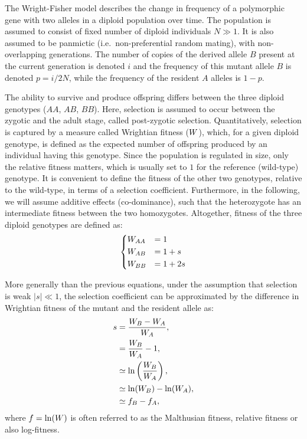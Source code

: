 The Wright-Fisher model describes the change in frequency of a polymorphic gene with two alleles in a diploid population over time.
The population is assumed to consist of fixed number of diploid individuals $N \gg 1$.
It is also assumed to be panmictic (i.e.~non-preferential random mating), with non-overlapping generations.
The number of copies of the derived allele $B$ present at the current generation is denoted $i$ and the frequency of this mutant allele $B$ is denoted $p = i/2N$, while the frequency of the resident $A$ alleles is $1 - p$.

The ability to survive and produce offspring differs between the three diploid genotypes ($AA$, $AB$, $BB$).
Here, selection is assumed to occur between the zygotic and the adult stage, called post-zygotic selection.
Quantitatively, selection is captured by a measure called Wrightian fitness ($W$), which, for a given diploid genotype, is defined as the expected number of offspring produced by an individual having this genotype.
Since the population is regulated in size, only the relative fitness matters, which is usually set to $1$ for the reference (wild-type) genotype.
It is convenient to define the fitness of the other two genotypes, relative to the wild-type, in terms of a selection coefficient.
Furthermore, in the following, we will assume additive effects (co-dominance), such that the heterozygote has an intermediate fitness between the two homozygotes.
Altogether, fitness of the three diploid genotypes are defined as:
\begin{equation}
    \begin{dcases}
        W_{AA} & = 1 \\
        W_{AB} & = 1 + s \\
        W_{BB} & = 1 + 2s \\
    \end{dcases}
\end{equation}

More generally than the previous equations, under the assumption that selection is weak $|s| \ll 1$, the selection coefficient can be approximated by the difference in Wrightian fitness of the mutant and the resident allele as:
\begin{align}
    s & = \dfrac{W_{B} - W_{A}}{W_{A}}, \\
    & = \dfrac{W_{B}}{W_{A}} - 1, \\
    & \simeq \ln\left( \dfrac{W_{B}}{W_{A}} \right), \\
    & \simeq \ln(W_{B}) - \ln(W_{A}), \\
    & \simeq f_{B} - f_{A},
\end{align}
where $f = \ln(W)$ is often referred to as the Malthusian fitness, relative fitness or also log-fitness.


